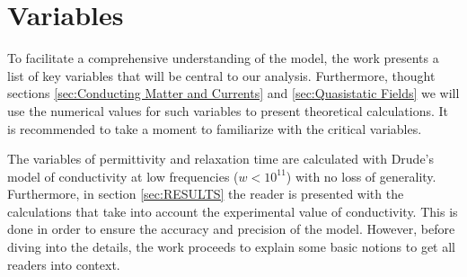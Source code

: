 \section{Variables}
To facilitate a comprehensive understanding of the model, the work presents a list of key variables 
that will be central to our analysis. 
Furthermore, thought sections \ref{sec:Conducting Matter and Currents} and \ref{sec:Quasistatic Fields} we will use the numerical values for such variables to present theoretical calculations. It is recommended to take a moment to familiarize with the critical variables. 
\\
\begin{center}
    \begin{table}[H]
    \caption{Critical Variables. This table presents key parameters related to copper conductors used in the study. The units specified for each parameter are shown in square brackets. }
    \end{table}
\end{center}

The variables of permittivity and relaxation time are calculated with Drude's model of conductivity at low frequencies ($w < 10^{11}$) with no loss of generality.
Furthermore, in section \ref{sec:RESULTS} the reader is presented with the calculations that take into account the experimental value of conductivity. 
This is done in order to ensure the accuracy and precision of the model. However, before diving into the details, the work proceeds to explain some basic notions to get all readers into context.
\\


